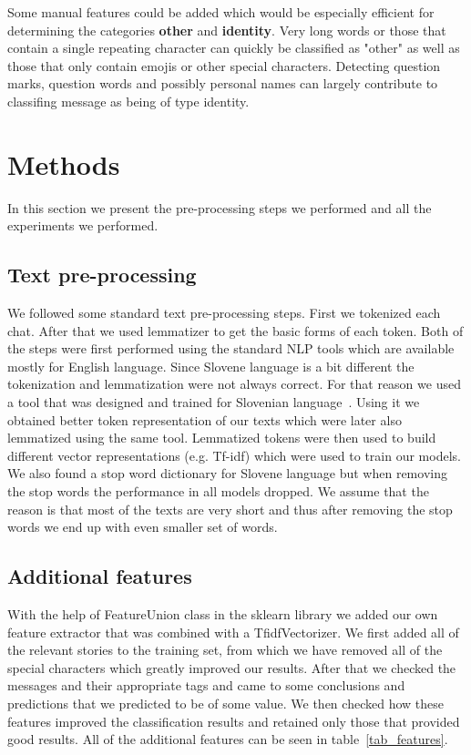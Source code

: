 \documentclass[11pt,a4paper]{article}
\begin{document}
Some manual features could be added which would be especially efficient for determining the categories \textbf{other} and \textbf{identity}.
Very long words or those that contain a single repeating character can quickly be classified as "other" as well as those that only contain emojis or other special characters.
Detecting question marks, question words and possibly personal names can largely contribute to classifing message as being of type identity.

\section{Methods}
In this section we present the pre-processing steps we performed and all the experiments we performed.

\subsection{Text pre-processing}
We followed some standard text pre-processing steps.
First we tokenized each chat.
After that we used lemmatizer to get the basic forms of each token.
Both of the steps were first performed using the standard NLP tools which are available mostly for English language.
Since Slovene language is a bit different the tokenization and lemmatization were not always correct.
For that reason we used a tool that was designed and trained for Slovenian language~\cite{slotokenizer}.
Using it we obtained better token representation of our texts which were later also lemmatized using the same tool.
Lemmatized tokens were then used to build different vector representations (e.g. Tf-idf) which were used to train our models.
We also found a stop word dictionary for Slovene language but when removing the stop words the performance in all models dropped.
We assume that the reason is that most of the texts are very short and thus after removing the stop words we end up with even smaller set of words.

\subsection{Additional features}

With the help of FeatureUnion class in the sklearn library we added our own feature extractor that was combined with a TfidfVectorizer.
We first added all of the relevant stories to the training set, from which we have removed all of the special characters which greatly improved our results.
After that we checked the messages and their appropriate tags and came to some conclusions and predictions that we predicted to be of some value.
We then checked how these features improved the classification results and retained only those that provided good results.
All of the additional features can be seen in table~\ref{tab_features}.
\end{document}
